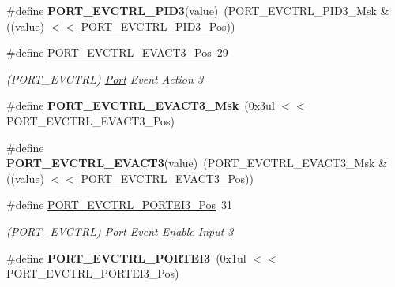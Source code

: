 \begin{DoxyCompactItemize}
\item 
\hypertarget{group___s_a_m_l21___p_o_r_t_ga718dc93cbf01d907bf0e08061e23fa16}{}\#define {\bfseries P\+O\+R\+T\+\_\+\+E\+V\+C\+T\+R\+L\+\_\+\+P\+I\+D3}(value)~(P\+O\+R\+T\+\_\+\+E\+V\+C\+T\+R\+L\+\_\+\+P\+I\+D3\+\_\+\+Msk \& ((value) $<$$<$ \hyperlink{group___s_a_m_l21___p_o_r_t_gac60f3d827e52d29afc68baf448f3133b}{P\+O\+R\+T\+\_\+\+E\+V\+C\+T\+R\+L\+\_\+\+P\+I\+D3\+\_\+\+Pos}))\label{group___s_a_m_l21___p_o_r_t_ga718dc93cbf01d907bf0e08061e23fa16}

\item 
\hypertarget{group___s_a_m_l21___p_o_r_t_gaa35b06ebab0565a6a5ee15f1099ac4c4}{}\#define \hyperlink{group___s_a_m_l21___p_o_r_t_gaa35b06ebab0565a6a5ee15f1099ac4c4}{P\+O\+R\+T\+\_\+\+E\+V\+C\+T\+R\+L\+\_\+\+E\+V\+A\+C\+T3\+\_\+\+Pos}~29\label{group___s_a_m_l21___p_o_r_t_gaa35b06ebab0565a6a5ee15f1099ac4c4}

\begin{DoxyCompactList}\small\item\em (P\+O\+R\+T\+\_\+\+E\+V\+C\+T\+R\+L) \hyperlink{struct_port}{Port} Event Action 3 \end{DoxyCompactList}\item 
\hypertarget{group___s_a_m_l21___p_o_r_t_gaf5a3c61a631db36e1ef5b0ecdf8e5e71}{}\#define {\bfseries P\+O\+R\+T\+\_\+\+E\+V\+C\+T\+R\+L\+\_\+\+E\+V\+A\+C\+T3\+\_\+\+Msk}~(0x3ul $<$$<$ P\+O\+R\+T\+\_\+\+E\+V\+C\+T\+R\+L\+\_\+\+E\+V\+A\+C\+T3\+\_\+\+Pos)\label{group___s_a_m_l21___p_o_r_t_gaf5a3c61a631db36e1ef5b0ecdf8e5e71}

\item 
\hypertarget{group___s_a_m_l21___p_o_r_t_ga3ad7c5b187811e20124753a158c9a310}{}\#define {\bfseries P\+O\+R\+T\+\_\+\+E\+V\+C\+T\+R\+L\+\_\+\+E\+V\+A\+C\+T3}(value)~(P\+O\+R\+T\+\_\+\+E\+V\+C\+T\+R\+L\+\_\+\+E\+V\+A\+C\+T3\+\_\+\+Msk \& ((value) $<$$<$ \hyperlink{group___s_a_m_l21___p_o_r_t_gaa35b06ebab0565a6a5ee15f1099ac4c4}{P\+O\+R\+T\+\_\+\+E\+V\+C\+T\+R\+L\+\_\+\+E\+V\+A\+C\+T3\+\_\+\+Pos}))\label{group___s_a_m_l21___p_o_r_t_ga3ad7c5b187811e20124753a158c9a310}

\item 
\hypertarget{group___s_a_m_l21___p_o_r_t_ga7cd6572f4b33d084356d9a523ded28de}{}\#define \hyperlink{group___s_a_m_l21___p_o_r_t_ga7cd6572f4b33d084356d9a523ded28de}{P\+O\+R\+T\+\_\+\+E\+V\+C\+T\+R\+L\+\_\+\+P\+O\+R\+T\+E\+I3\+\_\+\+Pos}~31\label{group___s_a_m_l21___p_o_r_t_ga7cd6572f4b33d084356d9a523ded28de}

\begin{DoxyCompactList}\small\item\em (P\+O\+R\+T\+\_\+\+E\+V\+C\+T\+R\+L) \hyperlink{struct_port}{Port} Event Enable Input 3 \end{DoxyCompactList}\item 
\hypertarget{group___s_a_m_l21___p_o_r_t_ga47cb485a47d099c325a5a9280e4d0bab}{}\#define {\bfseries P\+O\+R\+T\+\_\+\+E\+V\+C\+T\+R\+L\+\_\+\+P\+O\+R\+T\+E\+I3}~(0x1ul $<$$<$ P\+O\+R\+T\+\_\+\+E\+V\+C\+T\+R\+L\+\_\+\+P\+O\+R\+T\+E\+I3\+\_\+\+Pos)\label{group___s_a_m_l21___p_o_r_t_ga47cb485a47d099c325a5a9280e4d0bab}


\end{DoxyCompactItemize}
